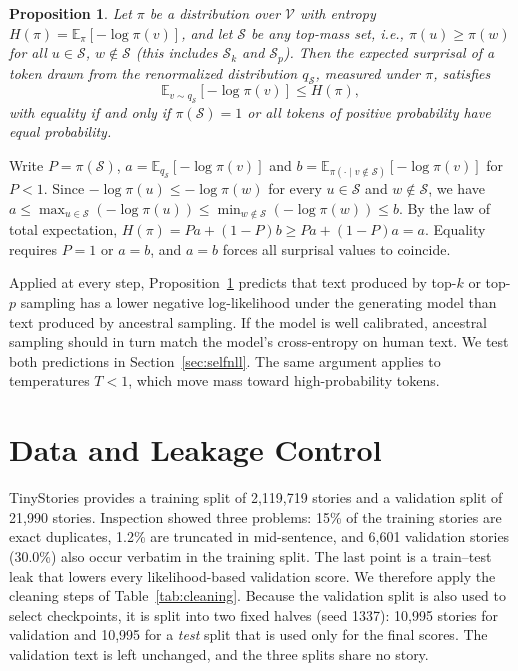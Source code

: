 \documentclass[journal]{IEEEtran}
\newtheorem{proposition}{Proposition}
\begin{document}
\begin{proposition}
\label{prop:trunc}
Let $\pi$ be a distribution over $\mathcal{V}$ with entropy $H(\pi)=\mathbb{E}_{\pi}[-\log\pi(v)]$, and let $\mathcal{S}$ be any top-mass set, i.e., $\pi(u)\ge\pi(w)$ for all $u\in\mathcal{S}$, $w\notin\mathcal{S}$ (this includes $\mathcal{S}_k$ and $\mathcal{S}_p$). Then the expected surprisal of a token drawn from the renormalized distribution $q_{\mathcal{S}}$, measured under $\pi$, satisfies
\begin{equation}
\mathbb{E}_{v\sim q_{\mathcal{S}}}[-\log\pi(v)] \le H(\pi),
\end{equation}
with equality if and only if $\pi(\mathcal{S})=1$ or all tokens of positive probability have equal probability.
\end{proposition}
\begin{IEEEproof}
Write $P=\pi(\mathcal{S})$, $a=\mathbb{E}_{q_{\mathcal{S}}}[-\log\pi(v)]$ and $b=\mathbb{E}_{\pi(\cdot\mid v\notin\mathcal{S})}[-\log\pi(v)]$ for $P<1$. Since $-\log\pi(u)\le-\log\pi(w)$ for every $u\in\mathcal{S}$ and $w\notin\mathcal{S}$, we have $a\le\max_{u\in\mathcal{S}}(-\log\pi(u))\le\min_{w\notin\mathcal{S}}(-\log\pi(w))\le b$. By the law of total expectation, $H(\pi)=Pa+(1-P)b\ge Pa+(1-P)a=a$. Equality requires $P=1$ or $a=b$, and $a=b$ forces all surprisal values to coincide.
\end{IEEEproof}

Applied at every step, Proposition~\ref{prop:trunc} predicts that text produced by top-$k$ or top-$p$ sampling has a lower negative log-likelihood under the generating model than text produced by ancestral sampling. If the model is well calibrated, ancestral sampling should in turn match the model's cross-entropy on human text. We test both predictions in Section~\ref{sec:selfnll}. The same argument applies to temperatures $T<1$, which move mass toward high-probability tokens.

\section{Data and Leakage Control}
\label{sec:data}

TinyStories \cite{eldan2023tinystories} provides a training split of 2,119,719 stories and a validation split of 21,990 stories. Inspection showed three problems: 15\% of the training stories are exact duplicates, 1.2\% are truncated in mid-sentence, and 6,601 validation stories (30.0\%) also occur verbatim in the training split. The last point is a train--test leak that lowers every likelihood-based validation score. We therefore apply the cleaning steps of Table~\ref{tab:cleaning}. Because the validation split is also used to select checkpoints, it is split into two fixed halves (seed 1337): 10,995 stories for validation and 10,995 for a \emph{test} split that is used only for the final scores. The validation text is left unchanged, and the three splits share no story.
\end{document}
